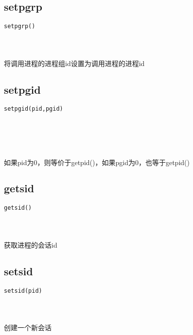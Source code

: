 \documentclass[10pt,a4paper]{article}
\begin{document}
\subsection{setpgrp}
\begin{spacing}{2.0}
\lstset{language=C,numbers=none}
\begin{lstlisting}
setpgrp()
\end{lstlisting}
\paragraph{ \ \ }将调用进程的进程组id设置为调用进程的进程id
\end{spacing}

\subsection{setpgid}
\begin{spacing}{2.0}
\lstset{language=C,numbers=none}
\begin{lstlisting}
setpgid(pid,pgid)
\end{lstlisting}
{\large\color[rgb]{0.2,0.4,0.6}{pid:}} \\
{\large\color[rgb]{0.2,0.4,0.6}{pgid:}}
\paragraph{ \ \ }如果pid为0，则等价于getpid()，如果pgid为0，也等于getpid()
\end{spacing}

\subsection{getsid}
\begin{spacing}{2.0}
\lstset{language=C,numbers=none}
\begin{lstlisting}
getsid()
\end{lstlisting}
\paragraph{ \ \ }获取进程的会话id
\end{spacing}

\subsection{setsid}
\begin{spacing}{2.0}
\lstset{language=C,numbers=none}
\begin{lstlisting}
setsid(pid)
\end{lstlisting}
{\large\color[rgb]{0.2,0.4,0.6}{pid:}}
\paragraph{ \ \ }创建一个新会话
\end{spacing}
\end{document}

